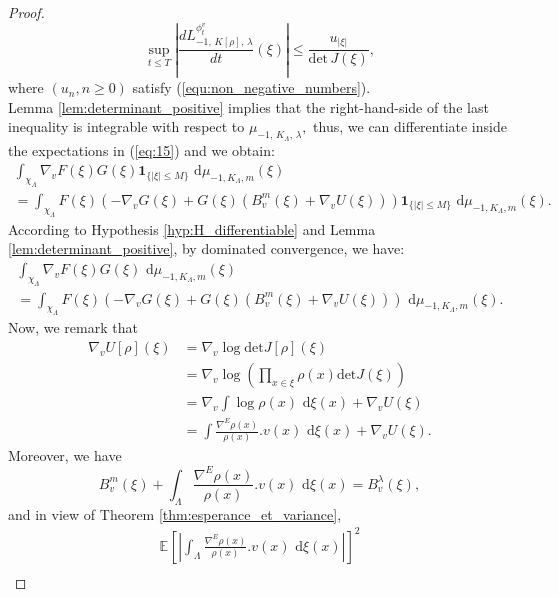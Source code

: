\documentclass[11pt,a4paper]{amsart}
\begin{document}
\begin{proof}
\begin{equation*}
    \sup_{t\le T}\left |\frac{d L_{-1,\, K[\rho],\, \lambda}^{\phi_t^v} }{dt}(\xi)\right|\le
    \frac{ u_{|\xi|}}{{{\text{det}}}\, J(\xi)},
  \end{equation*}
  where $(u_n, n\ge 0)$ satisfy (\ref{equ:non_negative_numbers}).\\
  Lemma \ref{lem:determinant_positive} implies that the
  right-hand-side of the last inequality is integrable with respect to
  $\mu_{-1,\, K_\Lambda, \, \lambda},$ thus, we can differentiate
  inside the expectations in (\ref{eq:15}) and we obtain:
  \begin{multline*}
    \int_{\chi_\Lambda} \nabla_v F(\xi) G(\xi) {{\mathbf 1}}_{\{| \xi|\le
      M\}}{\text{ d}}\mu_{-1,K_\Lambda,m}(\xi) \\
    =\int_{\chi_\Lambda} F(\xi)\left(-\nabla_v G(\xi) +G(\xi)
      \left(B_v^m (\xi)+\nabla_vU(\xi)\right) \right){{\mathbf 1}}_{\{| \xi|\le
      M\}}{\text{ d}}\mu_{-1,K_\Lambda,m}(\xi).
  \end{multline*}
  According to Hypothesis \ref{hyp:H_differentiable} and Lemma
  \ref{lem:determinant_positive}, by dominated convergence, we have:
  \begin{multline*}
    \int_{\chi_\Lambda} \nabla_v F(\xi) G(\xi) {\text{ d}}\mu_{-1,K_\Lambda,m}(\xi) \\
    =\int_{\chi_\Lambda} F(\xi)\left(-\nabla_v G(\xi) +G(\xi)
      \left(B_v^m (\xi)+\nabla_vU(\xi)\right)
    \right){\text{ d}}\mu_{-1,K_\Lambda,m}(\xi).
  \end{multline*}
  Now, we remark that
  \begin{align*}
    \nabla_v U[\rho](\xi)&=\nabla_v \log {{\text{det}}} J[\rho](\xi)\\
    &=\nabla_v \log \left (\prod_{x\in \xi}\rho(x){{\text{det}}} J(\xi)\right)\\
    &=\nabla_v \int \log \rho(x){\text{ d}}\xi(x)+\nabla_v U(\xi)\\
    &=\int \frac{\nabla^E\rho(x)}{\rho(x)}.v(x){\text{ d}}\xi(x) +\nabla_v
    U(\xi).
  \end{align*}
  Moreover, we have
  \begin{equation*}
    B_v^m (\xi)+\int_\Lambda \frac{\nabla^E\rho(x)}{\rho(x)}.v(x){\text{ d}}\xi(x)=B^\lambda_v(\xi),
  \end{equation*}
  and in view of Theorem \ref{thm:esperance_et_variance},
  \begin{multline*}
    {{\mathbb E}_{{}}\left[{{\left|\int_\Lambda
        \frac{\nabla^E\rho(x)}{\rho(x)}.v(x){\text{ d}}\xi(x)\right|}}\right]}^2\\

\end{multline*}
\end{proof}
\end{document}
